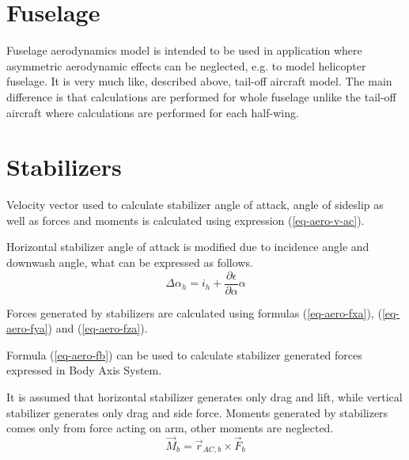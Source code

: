 \section{Fuselage}

Fuselage aerodynamics model is intended to be used in application where asymmetric aerodynamic effects can be neglected, e.g. to model helicopter fuselage. It is very much like, described above, tail-off aircraft model. The main difference is that calculations are performed for whole fuselage unlike the tail-off aircraft where calculations are performed for each half-wing.

\section{Stabilizers}

Velocity vector used to calculate stabilizer angle of attack, angle of sideslip as well as forces and moments is calculated using expression (\ref{eq-aero-v-ac}).

Horizontal stabilizer angle of attack is modified due to incidence angle and downwash angle, what can be expressed as follows. \cite{Etkin1972}
\begin{equation}
  \Delta \alpha_h
  =
  i_h + \frac{ \partial \epsilon }{ \partial \alpha } \alpha
\end{equation}

Forces generated by stabilizers are calculated using formulas (\ref{eq-aero-fxa}), (\ref{eq-aero-fya}) and (\ref{eq-aero-fza}).

Formula (\ref{eq-aero-fb}) can be used to calculate stabilizer generated forces expressed in Body Axis System.

It is assumed that horizontal stabilizer generates only drag and lift, while vertical stabilizer generates only drag and side force. Moments generated by stabilizers comes only from force acting on arm, other moments are neglected.
\begin{equation}
  {\vec M}_b = {\vec r}_{AC,b} \times {\vec F}_b
\end{equation}
